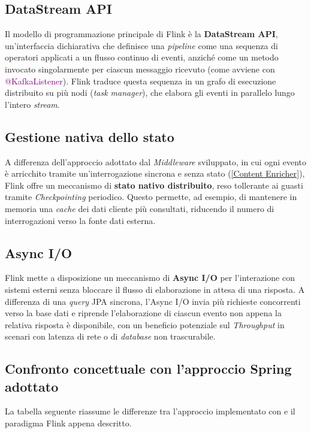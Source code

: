 \subsection{DataStream API}
Il modello di programmazione principale di Flink è la \textbf{DataStream \acrshort{API}}, un'interfaccia dichiarativa che definisce una \textit{pipeline} come una sequenza di operatori applicati a un flusso continuo di eventi, anziché come un metodo invocato singolarmente per ciascun messaggio ricevuto (come avviene con \textcolor{purple}{@KafkaListener}). 
Flink traduce questa sequenza in un grafo di esecuzione distribuito su più nodi (\textit{task manager}), che elabora gli eventi in parallelo lungo l'intero \textit{stream}.

\newpage
\subsection{Gestione nativa dello stato}
A differenza dell'approccio adottato dal \textit{Middleware} sviluppato, in cui ogni evento è arricchito tramite un'interrogazione sincrona e senza stato (\ref{Content Enricher}), Flink offre un meccanismo di \textbf{stato nativo distribuito}, reso tollerante ai guasti tramite \textit{\gls{Checkpointing}} periodico. 
Questo permette, ad esempio, di mantenere in memoria una \textit{cache} dei dati cliente più consultati, riducendo il numero di interrogazioni verso la fonte dati esterna.

\subsection{Async I/O}
\label{Async I/O}
Flink mette a disposizione un meccanismo di \textbf{Async I/O} per l'interazione con sistemi esterni senza bloccare il flusso di elaborazione in attesa di una risposta. 
A differenza di una \textit{query} \acrshort{JPA} sincrona, l'Async I/O invia più richieste concorrenti verso la base dati e riprende l'elaborazione di ciascun evento non appena la relativa risposta è disponibile, con un beneficio potenziale sul \textit{\gls{Throughput}} in scenari con latenza di rete o di \textit{database} non trascurabile.

\subsection{Confronto concettuale con l'approccio Spring adottato}
\label{Confronto concettuale con l'approccio Spring adottato}
La tabella seguente riassume le differenze tra l'approccio implementato con  e il paradigma Flink appena descritto.

